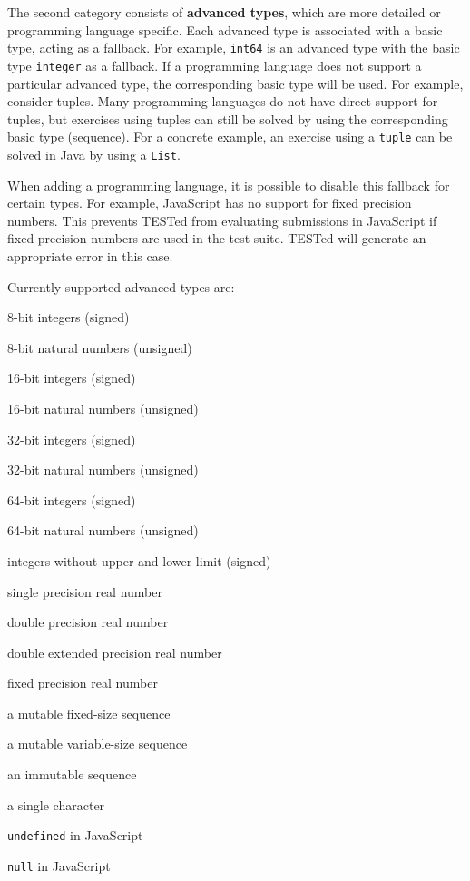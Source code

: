 \documentclass[../main]{subfiles}
\begin{document}
The second category consists of \textbf{advanced types}, which are more detailed or programming language specific.
Each advanced type is associated with a basic type, acting as a fallback.
For example, \texttt{int64} is an advanced type with the basic type \texttt{integer} as a fallback.
If a programming language does not support a particular advanced type, the corresponding basic type will be used.
For example, consider tuples.
Many programming languages do not have direct support for tuples, but exercises using tuples can still be solved by using the corresponding basic type (sequence).
For a concrete example, an exercise using a \texttt{tuple} can be solved in Java by using a \texttt{List}.

When adding a programming language, it is possible to disable this fallback for certain types.
For example, JavaScript has no support for fixed precision numbers.
This prevents TESTed from evaluating submissions in JavaScript if fixed precision numbers are used in the test suite.
TESTed will generate an appropriate error in this case.

Currently supported advanced types are:

\begin{description}[noitemsep]
    \item[\texttt{int8}] 8-bit integers (signed)
    \item[\texttt{uint8}] 8-bit natural numbers (unsigned)
    \item[\texttt{int16}] 16-bit integers (signed)
    \item[\texttt{uint16}] 16-bit natural numbers (unsigned)
    \item[\texttt{int32}] 32-bit integers (signed)
    \item[\texttt{uint32}] 32-bit natural numbers (unsigned)
    \item[\texttt{int64}] 64-bit integers (signed)
    \item[\texttt{uint64}] 64-bit natural numbers (unsigned)
    \item[\texttt{bigint}] integers without upper and lower limit (signed)
    \item[\texttt{single\_precision}] single precision real number
    \item[\texttt{double\_precision}] double precision real number
    \item[\texttt{double\_extended}] double extended precision real number
    \item[\texttt{fixed\_precision}] fixed precision real number
    \item[\texttt{array}] a mutable fixed-size sequence
    \item[\texttt{list}] a mutable variable-size sequence
    \item[\texttt{tuple}] an immutable sequence
    \item[\texttt{char}] a single character
    \item[\texttt{undefined}] \texttt{undefined} in JavaScript
    \item[\texttt{null}] \texttt{null} in JavaScript
\end{description}
\end{document}
